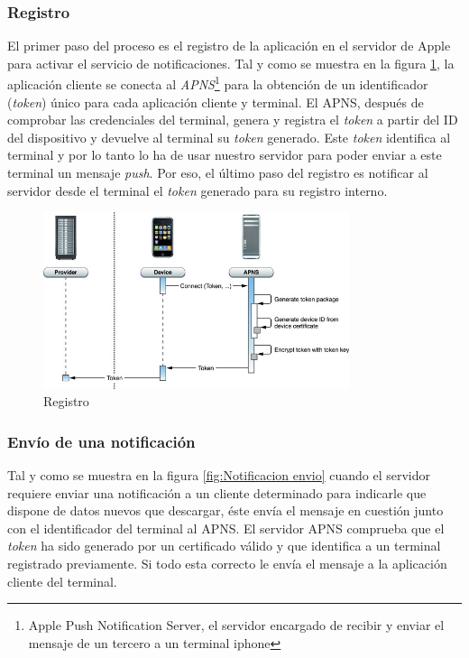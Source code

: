    \subsubsection{Registro}

     El primer paso del proceso es el registro de la aplicación en el servidor de Apple para activar el servicio de notificaciones. Tal y como se muestra en la figura \ref{fig:Notificacion Registro}, la aplicación cliente se conecta al \emph{APNS}\footnote{Apple Push Notification Server, el servidor encargado de recibir y enviar el mensaje de un tercero a un terminal iphone} para la obtención de un identificador (\emph{token}) único para cada aplicación cliente y terminal. El APNS, después de comprobar las credenciales del terminal, genera y registra el \emph{token} a partir del ID del dispositivo y devuelve al terminal su \emph{token} generado. Este \emph{token} identifica al terminal y por lo tanto lo ha de usar nuestro servidor para poder enviar a este terminal un mensaje \emph{push}. Por eso, el último paso del registro es notificar al servidor desde el terminal el \emph{token} generado para su registro interno.
     
 \begin{figure}[h!]
    \centering
       \includegraphics[width=0.8\textwidth]{./images/token_generation.jpg}
     \caption{Registro }
   \label{fig:Notificacion Registro}
\end{figure}
  
     \subsubsection{Envío de una notificación}
     
     Tal y como se muestra en la figura \ref{fig:Notificacion envio} cuando el servidor requiere enviar una notificación a un cliente determinado para indicarle que dispone de datos nuevos que descargar, éste envía el mensaje en cuestión junto con el identificador del terminal al APNS. El servidor APNS comprueba que el \emph{token} ha sido generado por un certificado válido y que identifica a un terminal registrado previamente. Si todo esta correcto le envía el mensaje a la aplicación cliente del terminal.
     
